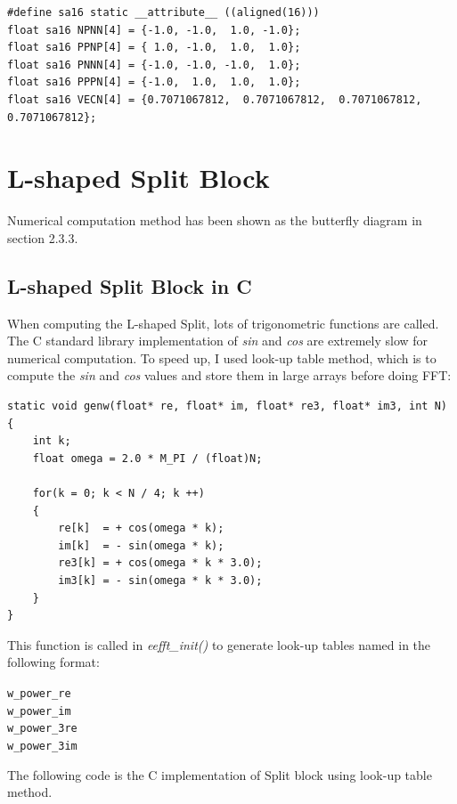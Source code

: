 \documentclass[a4paper]{report}
\begin{document}
    \lstset{language = c, tabsize = 4}
    \begin{lstlisting}
#define sa16 static __attribute__ ((aligned(16)))
float sa16 NPNN[4] = {-1.0, -1.0,  1.0, -1.0};
float sa16 PPNP[4] = { 1.0, -1.0,  1.0,  1.0};
float sa16 PNNN[4] = {-1.0, -1.0, -1.0,  1.0};
float sa16 PPPN[4] = {-1.0,  1.0,  1.0,  1.0};
float sa16 VECN[4] = {0.7071067812,  0.7071067812,  0.7071067812,  0.7071067812};
    \end{lstlisting}

\section{L-shaped Split Block} \indent


	Numerical computation method has been shown as the butterfly diagram in section 2.3.3.

\subsection{L-shaped Split Block in C} \indent

	When computing the L-shaped Split, lots of trigonometric functions are called. The C standard library implementation of \textit{sin} and \textit{cos} are extremely slow for numerical computation. To speed up, I used look-up table method, which is to compute the \textit{sin} and \textit{cos} values and store them in large arrays before doing FFT:
	
    \lstset{language = c, tabsize = 4}
    \begin{lstlisting}
static void genw(float* re, float* im, float* re3, float* im3, int N)
{
    int k;
    float omega = 2.0 * M_PI / (float)N;
    
    for(k = 0; k < N / 4; k ++)
    {
        re[k]  = + cos(omega * k);
        im[k]  = - sin(omega * k);
        re3[k] = + cos(omega * k * 3.0);
        im3[k] = - sin(omega * k * 3.0);
    }
}
    \end{lstlisting}
    
    This function is called in \textit{eefft\_init()} to generate look-up tables named in the following format:
    
\begin{alltt}
\centering
w_power_re
w_power_im
w_power_3re
w_power_3im
\end{alltt}
    
    The following code is the C implementation of Split block using look-up table method.
\end{document}
